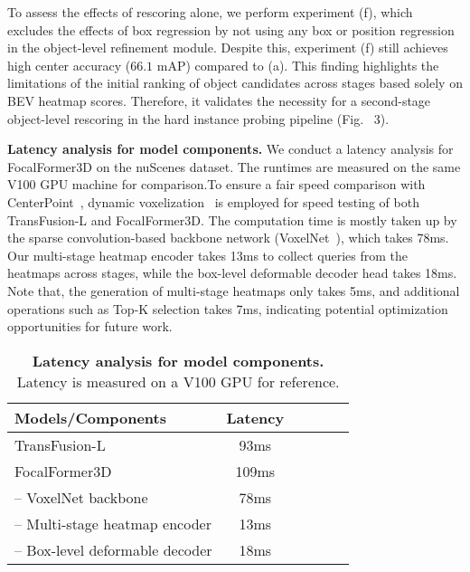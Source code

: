 \documentclass[10pt,twocolumn,letterpaper]{article}
\begin{document}
To assess the effects of rescoring alone, we perform experiment (f), which excludes the effects of box regression by not using any box or position regression in the object-level refinement module. Despite this, experiment (f) still achieves high center accuracy ($66.1$ mAP) compared to (a). This finding highlights the limitations of the initial ranking of object candidates across stages based solely on BEV heatmap scores. Therefore, it validates the necessity for a second-stage object-level rescoring in the hard instance probing pipeline (Fig.~{\color{red} 3}). 



\vspace{2mm}
\noindent\textbf{Latency analysis for model components.}
We conduct a latency analysis for FocalFormer3D on the nuScenes dataset. The runtimes are measured on the same V100 GPU machine for comparison.To ensure a fair speed comparison with CenterPoint~\cite{centerpoint}, dynamic voxelization~\cite{dynamicvoxelization} is employed for speed testing of both TransFusion-L and FocalFormer3D. The computation time is mostly taken up by the sparse convolution-based backbone network (VoxelNet~\cite{VoxelNet, second}), which takes 78ms. Our multi-stage heatmap encoder takes 13ms to collect queries from the heatmaps across stages, while the box-level deformable decoder head takes 18ms. Note that, the generation of multi-stage heatmaps only takes 5ms, and additional operations such as Top-K selection takes 7ms, indicating potential optimization opportunities for future work.
\begin{table}[bpt]
	\begin{center}
\begin{tabular}{lccccc}
		\toprule
		 Models/Components & Latency  \\ \midrule
            TransFusion-L & 93ms \\ \midrule
            FocalFormer3D & 109ms \\ 
            --   VoxelNet backbone & 78ms \\
            --   Multi-stage heatmap encoder & 13ms \\
            --   Box-level deformable decoder & 18ms \\
            \bottomrule
		\end{tabular}
	\end{center}
	\caption{\textbf{Latency analysis for model components.} Latency is measured on a V100 GPU for reference. }\label{tab:latency comparison}
\end{table}
\end{document}
